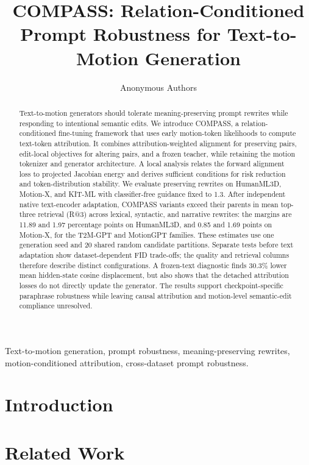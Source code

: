 \documentclass[journal]{IEEEtran}
\title{COMPASS: Relation-Conditioned Prompt Robustness for Text-to-Motion Generation}
\author{Anonymous Authors}
\begin{document}
\maketitle

\begin{abstract}
Text-to-motion generators should tolerate meaning-preserving prompt rewrites
while responding to intentional semantic edits. We introduce COMPASS, a
relation-conditioned fine-tuning framework that uses early motion-token
likelihoods to compute text-token attribution. It combines attribution-weighted
alignment for preserving pairs, edit-local objectives for altering pairs, and a
frozen teacher, while retaining the motion tokenizer and generator
architecture. A local analysis relates the
forward alignment loss to projected Jacobian energy and derives sufficient
conditions for risk reduction and token-distribution stability. We evaluate
preserving rewrites on HumanML3D, Motion-X, and KIT-ML with classifier-free
guidance fixed to 1.3. After independent native text-encoder adaptation,
COMPASS variants exceed their parents in mean top-three retrieval (R@3) across
lexical, syntactic, and narrative rewrites: the margins are 11.89 and 1.97
percentage points on HumanML3D, and 0.85 and 1.69 points on Motion-X, for the
T2M-GPT and MotionGPT families. These estimates use one generation seed and
20 shared random candidate partitions. Separate tests before text adaptation
show dataset-dependent FID trade-offs; the quality and retrieval columns
therefore describe distinct configurations. A frozen-text diagnostic finds
30.3\% lower mean hidden-state cosine displacement, but also shows that the
detached attribution losses do not directly update the generator. The results
support checkpoint-specific paraphrase robustness while leaving causal
attribution and motion-level semantic-edit compliance unresolved.
\end{abstract}

\begin{IEEEkeywords}
Text-to-motion generation, prompt robustness, meaning-preserving rewrites,
motion-conditioned attribution, cross-dataset prompt robustness.
\end{IEEEkeywords}

\section{Introduction}


\section{Related Work}

\end{document}
